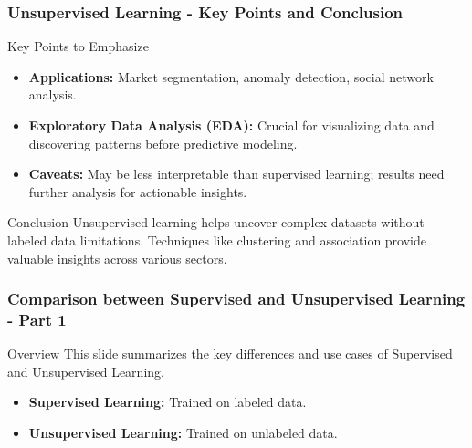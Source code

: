 \documentclass[aspectratio=169]{beamer}
\begin{document}
\begin{frame}[fragile]
    \frametitle{Unsupervised Learning - Key Points and Conclusion}
    \begin{block}{Key Points to Emphasize}
        \begin{itemize}
            \item \textbf{Applications:} Market segmentation, anomaly detection, social network analysis.
            \item \textbf{Exploratory Data Analysis (EDA):} Crucial for visualizing data and discovering patterns before predictive modeling.
            \item \textbf{Caveats:} May be less interpretable than supervised learning; results need further analysis for actionable insights.
        \end{itemize}
    \end{block}

    \begin{block}{Conclusion}
        Unsupervised learning helps uncover complex datasets without labeled data limitations. Techniques like clustering and association provide valuable insights across various sectors.
    \end{block}
\end{frame}

\begin{frame}[fragile]
    \frametitle{Comparison between Supervised and Unsupervised Learning - Part 1}
    \begin{block}{Overview}
        This slide summarizes the key differences and use cases of Supervised and Unsupervised Learning.
    \end{block}
    
    \begin{itemize}
        \item \textbf{Supervised Learning:} Trained on labeled data.
        \item \textbf{Unsupervised Learning:} Trained on unlabeled data.
    \end{itemize}
\end{frame}
\end{document}
